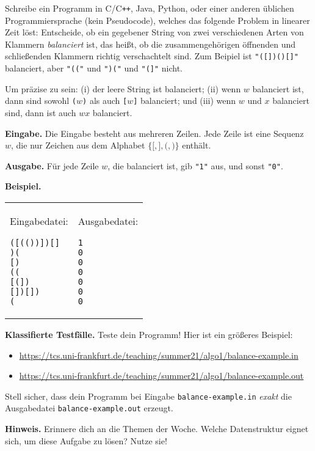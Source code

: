 \documentclass{uebung_cs}
\begin{document}
Schreibe ein Programm in C/C\verb|++|, Java, Python, oder einer anderen üblichen Programmiersprache (kein Pseudocode), welches das folgende Problem in linearer Zeit löst:
Entscheide, ob ein gegebener String von zwei verschiedenen Arten von Klammern \emph{balanciert} ist, das heißt, ob die zusammengehörigen öffnenden und schließenden Klammern richtig verschachtelt sind. Zum Beipiel ist \texttt{"([])()[]"} balanciert, aber \texttt{"(("} und \texttt{")("} und \texttt{"(]"} nicht.

Um präzise zu sein: (i) der leere String ist balanciert; (ii) wenn $w$ balanciert ist, dann sind sowohl \texttt{(}$w$\texttt{)} als auch \texttt{[}$w$\texttt{]} balanciert; und (iii) wenn $w$ und $x$ balanciert sind, dann ist auch $wx$ balanciert.

\textbf{Eingabe.}
Die Eingabe besteht aus mehreren Zeilen. Jede Zeile ist eine Sequenz $w$, die nur Zeichen aus dem Alphabet $\{\texttt{[},\texttt{]},\texttt{(},\texttt{)}\}$ enthält.

\textbf{Ausgabe.}
Für jede Zeile $w$, die balanciert ist, gib \texttt{"1"} aus, und sonst \texttt{"0"}.

\textbf{Beispiel.}\\
\begin{tabular}{p{}p{}}
Eingabedatei:
\begin{verbatim}
([(())])[]
)(
[)
((
[(])
[])[])
(
\end{verbatim}
&
Ausgabedatei:
\begin{verbatim}
1
0
0
0
0
0
0
\end{verbatim}
\end{tabular}

\textbf{Klassifierte Testfälle.}
Teste dein Programm! Hier ist ein größeres Beispiel:
\begin{itemize}[noitemsep]
\item \url{https://tcs.uni-frankfurt.de/teaching/summer21/algo1/balance-example.in}
\item \url{https://tcs.uni-frankfurt.de/teaching/summer21/algo1/balance-example.out}
\end{itemize}
Stell sicher, dass dein Programm bei Eingabe \texttt{balance-example.in} \emph{exakt} die Ausgabedatei \texttt{balance-example.out} erzeugt.

\textbf{Hinweis.}
Erinnere dich an die Themen der Woche. Welche Datenstruktur eignet sich, um diese Aufgabe zu lösen? Nutze sie!
\end{document}
